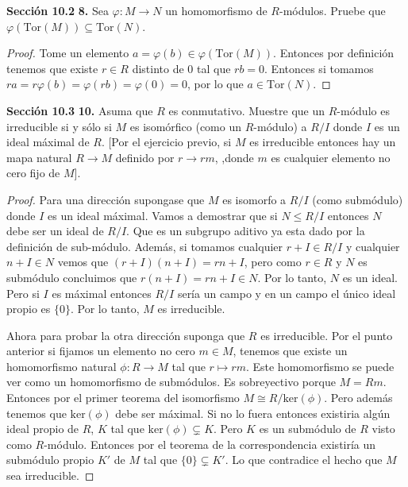 \documentclass[letter,twoside,12pt]{article}
\begin{document}
\textbf{Sección 10.2} \textbf{8.} Sea $ \varphi: M \to N $ un homomorfismo de $ R $-módulos. Pruebe que $ \varphi(\text{Tor}(M)) \subseteq \text{Tor}(N)$.

\begin{proof}
Tome un elemento $ a = \varphi(b) \in \varphi(\text{Tor}(M)) $. Entonces por definición tenemos que existe $ r \in R $ distinto de 0 tal que $ rb = 0 $. Entonces si tomamos $ ra = r\varphi(b)=\varphi(rb)=\varphi(0)=0 $, por lo que $ a \in \text{Tor}(N) $.
\end{proof}

\textbf{Sección 10.3} \textbf{10.} Asuma que $ R $ es conmutativo. Muestre que un $ R $-módulo es irreducible si y sólo si $ M $ es isomórfico (como un $ R $-módulo) a $ R/I $ donde $ I $ es un ideal máximal de $ R $. [Por el ejercicio previo, si $ M $ es irreducible entonces hay un mapa natural $ R \to M  $ definido por $ r \to rm  $, ,donde $ m $ es cualquier elemento no cero fijo de $ M $].

\begin{proof}
Para una dirección supongase que $ M $ es isomorfo a $ R/I $ (como submódulo) donde $ I $ es un ideal máximal. Vamos a demostrar que si $ N \leq R/I $ entonces $ N $ debe ser un ideal de $ R/I $.
Que es un subgrupo aditivo ya esta dado por la definición de sub-módulo. Además, si tomamos cualquier $ r + I \in R/I $ y cualquier $ n + I \in N $ vemos que $ (r + I)(n+I)=rn+I $, pero como $ r \in R $ y $ N $ es submódulo concluimos que $ r(n+I) =rn+I \in N$. Por lo tanto, $ N $ es un ideal. Pero si $ I $ es máximal entonces $ R/I $ sería un campo y en un campo el único ideal propio es $ \{0\} $. Por lo tanto, $ M $ es irreducible.

Ahora para probar la otra dirección suponga que $ R $ es irreducible. Por el punto anterior si fijamos un elemento no cero $ m \in M $, tenemos que existe un homomorfismo natural $\phi: R \to M $ tal que $ r \mapsto rm $. Este homomorfismo se puede ver como un homomorfismo de submódulos. Es sobreyectivo porque $ M = Rm $. Entonces por el primer teorema del isomorfismo $ M \cong R/\text{ker}(\phi) $. Pero además tenemos que $ \text{ker}(\phi) $ debe ser máximal. Si no lo fuera entonces existiria algún ideal propio de $ R $, $ K $ tal que $\text{ker}(\phi)\subsetneq K $. Pero $ K $ es un submódulo de $ R $ visto como $ R $-módulo. Entonces por el teorema de la correspondencia existiría un submódulo propio $ K ' $ de $ M $ tal que $ \{0\} \subsetneq K' $. Lo que contradice el hecho que $ M $ sea irreducible.    
\end{proof}
\end{document}
